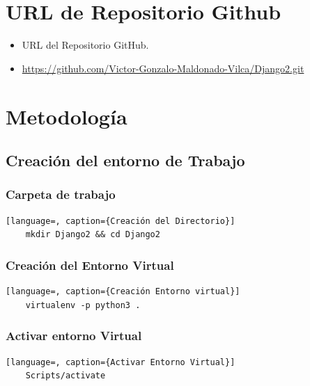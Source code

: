 \documentclass{article}
\begin{document}

  \section{URL de Repositorio Github}
  \begin{itemize}
    \item URL del Repositorio GitHub.
    \item \url{https://github.com/Victor-Gonzalo-Maldonado-Vilca/Django2.git}
  \end{itemize}
  \newpage


  \section{Metodología}

  
  \subsection{Creación del entorno de Trabajo}
  

  \subsubsection{Carpeta de trabajo}
  \begin{lstlisting}[language=, caption={Creación del Directorio}]
    mkdir Django2 && cd Django2
  \end{lstlisting}
  

  \subsubsection{Creación del Entorno Virtual}
  \begin{lstlisting}[language=, caption={Creación Entorno virtual}]
    virtualenv -p python3 .
  \end{lstlisting}
  

  \subsubsection{Activar entorno Virtual}
  \begin{lstlisting}[language=, caption={Activar Entorno Virtual}]
    Scripts/activate
  \end{lstlisting}
  
\end{document}
